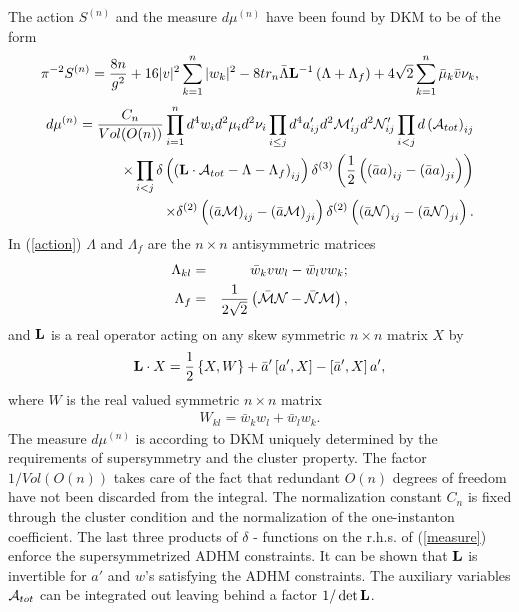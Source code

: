 \documentclass[a4paper,12pt]{article}
\begin{document}
The action $S^{(n)}$ and the measure $d\mu^{(n)}$ have been found by 
DKM to be of the form  
\begin{eqnarray}
\label{action}
\pi^{-2}S^{(n)}=\frac{8n}{g^2}+16|v|^2\sum_{k=1}^n |w_k|^2 
-8 tr_n \bar{\Lambda}{\bf L}^{-1}\left(\Lambda + \Lambda_{f} \right)  
+ 4\sqrt{2} \sum_{k=1}^n \bar{\mu}_k \bar{v} \nu_k ,
\end{eqnarray}
\begin{eqnarray} 
d\mu^{(n)} =\frac{C_n}{Vol(O(n))} \prod_{i=1}^n d^4 w_i 
d^2 \mu_i d^2 \nu_i \prod_{i\le j}d^4 a'_{ij} 
d^2 {\cal M}'_{ij} d^2 {\cal N}'_{ij} 
\prod_{i<j}d\left({\cal A}_{tot}\right)_{ij} \nonumber \\ 
\times \prod_{i<j}
\delta \left(\left({\bf L} \cdot {\cal A}_{tot}
-\Lambda -\Lambda_f\right)_{ij}\right)
\delta^{(3)}\left(\frac{1}{2}\left(
\left(\bar{a}a\right)_{ij}-\left(\bar{a}a\right)_{ji}
\right)\right) \nonumber \\ 
\times \delta^{(2)}\left(\left(\bar{a}{\cal M}\right)_{ij}-
\left(\bar{a}{\cal M}\right)_{ji}\right) 
\delta^{(2)}\left(\left(\bar{a}{\cal N}\right)_{ij}-
\left(\bar{a}{\cal N}\right)_{ji}\right).
\label{measure}  
\end{eqnarray}
In (\ref{action}) $\Lambda$ and $\Lambda_f$ are the $n\times n$ 
antisymmetric matrices 
\begin{eqnarray}  
\Lambda_{kl}&=&\bar{w}_k v w_l - \bar{w}_l v w_k ;\\
\Lambda_f&=&\frac{1}{2\sqrt{2}}\left(\bar{{\cal M}}{\cal N}- 
\bar{{\cal N}}{\cal M}\right),
\end{eqnarray} 
and ${\bf L}$ is a real operator acting on any skew symmetric 
$n\times n$ matrix $X$ by 
\begin{eqnarray} 
{\bf L}\cdot X = \frac{1}{2}\left\{X,W\right\} + 
\bar{a}'\left[a',X\right]- \left[\bar{a}',X\right]a', 
\label{loperator}
\end{eqnarray} 
where $W$ is the real valued symmetric $n\times n$ matrix
\begin{eqnarray}
W_{kl}=\bar{w}_k w_l +\bar{w}_l w_k.
\end{eqnarray} 
The measure $d\mu^{(n)}$ is according to DKM \cite{dorey3} uniquely determined 
by the requirements of supersymmetry and the cluster property. 
The factor $1/Vol(O(n))$ takes care of the fact that 
redundant $O(n)$ degrees of freedom have not been discarded 
from the integral. The normalization constant $C_n$ is fixed 
through the cluster condition and the normalization of the 
one-instanton coefficient. The last three products of 
$\delta$ - functions on the r.h.s. of (\ref{measure}) 
enforce the supersymmetrized ADHM constraints. It can be shown that 
${\bf L}$ is invertible for $a'$ and 
$w$'s satisfying the ADHM constraints. The auxiliary variables 
${\cal A}_{tot}$ can be integrated 
out leaving behind a factor $1/\det {\bf L}$.
\end{document}

